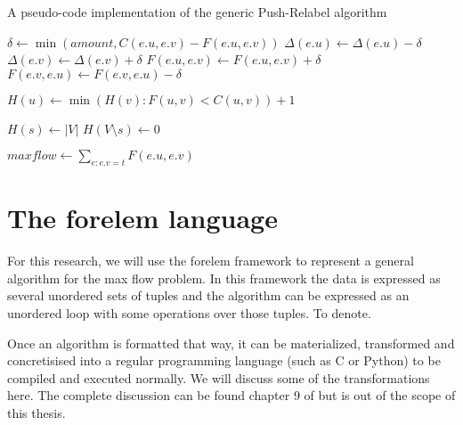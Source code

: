 \begin{algorithm}
\caption{A pseudo-code implementation of the generic Push-Relabel algorithm}
\label{algo:push-relabel}

\begin{algorithmic}
	\State $\delta \gets \min(amount, C(e.u, e.v) - F(e.u, e.v))$
	\State $\Delta(e.u) \gets \Delta(e.u) - \delta$
	\State $\Delta(e.v) \gets \Delta(e.v) + \delta$
	\State $F(e.u, e.v) \gets F(e.u, e.v) + \delta$
	\State $F(e.v, e.u) \gets F(e.v, e.u) - \delta$
\EndFunction

\State

	\State $H(u) \gets \min(H(v) : F(u, v) < C(u, v)) + 1$
\EndFunction

\State

	\State {}
\EndFor

\State

\State $H(s) \gets |V|$
\State $H(V \setminus s) \gets 0$

\State

		\State {}
	\Else
		\State {}
	\EndIf
\EndWhile

\State

\State $maxflow \gets \sum\limits_{e : e.v = t} F(e.u, e.v)$
\end{algorithmic}
\end{algorithm}

\section{The forelem language}

For this research, we will use the forelem framework \cite{AVersatileTupleBasedOptimizationFramework} to represent a general algorithm for the max flow problem. In this framework the data is expressed as several unordered sets of tuples and the algorithm can be expressed as an unordered loop with some operations over those tuples. To denote.


Once an algorithm is formatted that way, it can be materialized, transformed and concretisised into a regular programming language (such as C or Python) to be compiled and executed normally. We will discuss some of the transformations here. The complete discussion can be found chapter 9 of \cite{AVersatileTupleBasedOptimizationFramework} but is out of the scope of this thesis.

